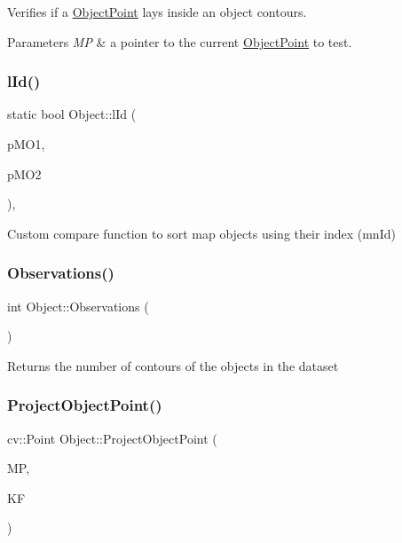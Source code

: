 Verifies if a \hyperlink{classObjectPoint}{Object\+Point} lays inside an object contours. 
\begin{DoxyParams}{Parameters}
{\em MP} & a pointer to the current \hyperlink{classObjectPoint}{Object\+Point} to test. \\
\hline
\end{DoxyParams}
\mbox{\label{classObject_aae2511e9146551564784a5841e104aac}} 
\subsubsection{\texorpdfstring{l\+Id()}{lId()}}
{\footnotesize\ttfamily static bool Object\+::l\+Id (\begin{DoxyParamCaption}\item[{\hyperlink{classObject}{Object} $\ast$}]{p\+M\+O1,  }\item[{\hyperlink{classObject}{Object} $\ast$}]{p\+M\+O2 }\end{DoxyParamCaption})\hspace{0.3cm}{\ttfamily [inline]}, {\ttfamily [static]}}

Custom compare function to sort map objects using their index (mn\+Id) \mbox{\label{classObject_a3b40498cabe036689eff2862e1fd8143}} 
\subsubsection{\texorpdfstring{Observations()}{Observations()}}
{\footnotesize\ttfamily int Object\+::\+Observations (\begin{DoxyParamCaption}{ }\end{DoxyParamCaption})}

Returns the number of contours of the objects in the dataset \mbox{\label{classObject_a38bd011f1b615252420ae2e89d786205}} 
\subsubsection{\texorpdfstring{Project\+Object\+Point()}{ProjectObjectPoint()}}
{\footnotesize\ttfamily cv\+::\+Point Object\+::\+Project\+Object\+Point (\begin{DoxyParamCaption}\item[{\hyperlink{classObjectPoint}{Object\+Point} $\ast$}]{MP,  }\item[{Key\+Frame $\ast$}]{KF }\end{DoxyParamCaption})}

